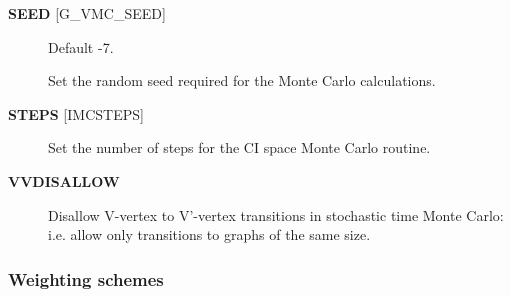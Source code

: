 \documentclass[openany,a4paper,10pt]{manual}
\begin{document}
\begin{description}
\item[\textbf{SEED} {[}G\_VMC\_SEED{]}]
Default -7.

Set the random seed required for the Monte Carlo calculations.

\item[\textbf{STEPS} {[}IMCSTEPS{]}]
Set the number of steps for the CI space Monte Carlo routine.

\item[\textbf{VVDISALLOW}]
Disallow V-vertex to V'-vertex transitions in stochastic time Monte
Carlo: i.e. allow only transitions to graphs of the same size.

\end{description}


\subsubsection{Weighting schemes}
\end{document}
